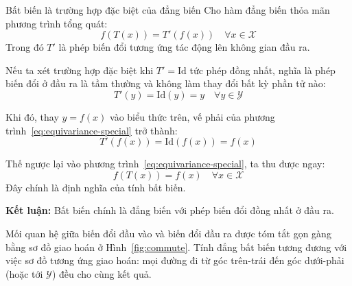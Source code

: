 \begin{infobox}{Bất biến là trường hợp đặc biệt của đẳng biến}
Cho hàm đẳng biến thỏa mãn phương trình tổng quát:
\begin{equation}
\label{eq:equivariance-special}
f(T(x)) = T'(f(x)) \quad \forall x \in \mathcal{X}
\end{equation}
Trong đó $T'$ là phép biến đổi tương ứng tác động lên không gian đầu ra.

Nếu ta xét trường hợp đặc biệt khi $T' = \mathrm{Id}$ tức phép đồng nhất, nghĩa là phép biến đổi ở đầu ra là tầm thường và không làm thay đổi bất kỳ phần tử nào:
\begin{equation}
T'(y) = \mathrm{Id}(y) = y \quad \forall y \in \mathcal{Y}
\end{equation}

Khi đó, thay $y = f(x)$ vào biểu thức trên, vế phải của phương trình~\eqref{eq:equivariance-special} trở thành:
\begin{equation}
T'(f(x)) = \mathrm{Id}(f(x)) = f(x)
\end{equation}

Thế ngược lại vào phương trình~\eqref{eq:equivariance-special}, ta thu được ngay:
\begin{equation}
\label{eq:invariance-special}
f(T(x)) = f(x) \quad \forall x \in \mathcal{X}
\end{equation}
Đây chính là định nghĩa của tính bất biến. 


\textbf{Kết luận:} Bất biến chính là đẳng biến với phép biến đổi đồng nhất ở đầu ra.
\end{infobox}
 
Mối quan hệ giữa biến đổi đầu vào và biến đổi đầu ra được tóm tắt gọn gàng bằng
sơ đồ giao hoán ở Hình~\ref{fig:commute}. Tính đẳng bất biến tương đương với việc sơ đồ tương ứng giao hoán: mọi đường đi từ góc trên-trái đến góc dưới-phải (hoặc tới $\mathcal{Y}$) đều cho cùng kết
quả.
 
